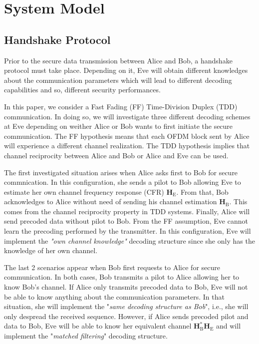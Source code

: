 \documentclass[journal,comsoc]{IEEEtran}
\newcommand{\HE}{\textbf{H}_{\text{E}}}
\newcommand{\HB}{\textbf{H}_{\text{B}}}
\begin{document}
\section{System Model}\label{sec:system-model}

\subsection{Handshake Protocol}
\label{sec:establishment}
Prior to the secure data transmission between Alice and Bob, a handshake protocol must take place. Depending on it, Eve will obtain different knowledges about the communication parameters which will lead to different decoding capabilities and so, different security performances. 

In this paper, we consider a Fast Fading (FF) Time-Division Duplex (TDD) communication. In doing so, we will investigate three different decoding schemes at Eve depending on weither Alice or Bob wants to first initiate the secure communication. The FF hypothesis means that each OFDM block sent by Alice will experience a different channel realization. The TDD hypothesis implies that channel reciprocity between Alice and Bob or Alice and Eve can be used. 

The first investigated situation arises when Alice asks first to Bob for secure commnication. In this configuration, she sends a pilot to Bob allowing Eve to estimate her own channel frequency response (CFR) $\HE$. From that, Bob acknowledges to Alice without need of sending his channel estimation $\HB$. This comes from the channel reciprocity property in TDD systems. Finally, Alice will send precoded data without pilot to Bob. From the FF assumption, Eve cannot learn the precoding performed by the transmitter. In this configuration, Eve will implement the \textit{"own channel knowledge"} decoding structure since she only has the knowledge of her own channel. 

The last 2 scenarios appear when Bob first requests to Alice for secure communication. In both cases, Bob transmits a pilot to Alice allowing her to know Bob's channel. If Alice only transmits precoded data to Bob, Eve will not be able to know anything about the communication parameters. In that situation, she will implement the "\textit{same decoding structure as Bob}", i.e., she will only despread the received sequence. However, if Alice sends precoded pilot and data to Bob, Eve will be able to know her equivalent channel $\HB^*\HE$ and will implement the "\textit{matched filtering}" decoding structure. 
\end{document}
